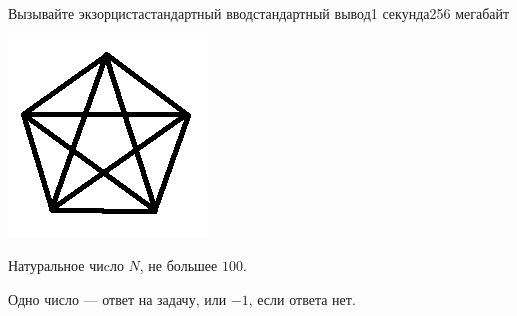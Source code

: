 \begin{problem}{Вызывайте экзорциста}{стандартный ввод}{стандартный вывод}{1 секунда}{256 мегабайт}

\includegraphics[natwidth=200,natheight=200]{bez_usloviya_image_ru_1.png}

\InputFile
Натуральное чиcло $N$, не большее $100$.

\OutputFile
Одно число --- ответ на задачу, или $-1$, если ответа нет.

\Examples

\begin{example}
%
%
%
\end{example}

\end{problem}

